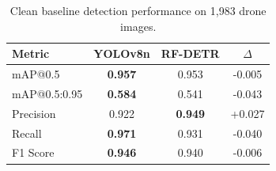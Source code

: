 \begin{table}[htbp]
\centering
\caption{Clean baseline detection performance on 1{,}983 drone images.}
\label{tab:clean_baseline}
\begin{tabular}{lccc}
\hline
\textbf{Metric} & \textbf{YOLOv8n} & \textbf{RF-DETR} & \textbf{$\Delta$} \\
\hline
mAP@0.5 & \textbf{0.957} & 0.953 & -0.005 \\
mAP@0.5:0.95 & \textbf{0.584} & 0.541 & -0.043 \\
Precision & 0.922 & \textbf{0.949} & +0.027 \\
Recall & \textbf{0.971} & 0.931 & -0.040 \\
F1 Score & \textbf{0.946} & 0.940 & -0.006 \\
\hline
\end{tabular}
\end{table}